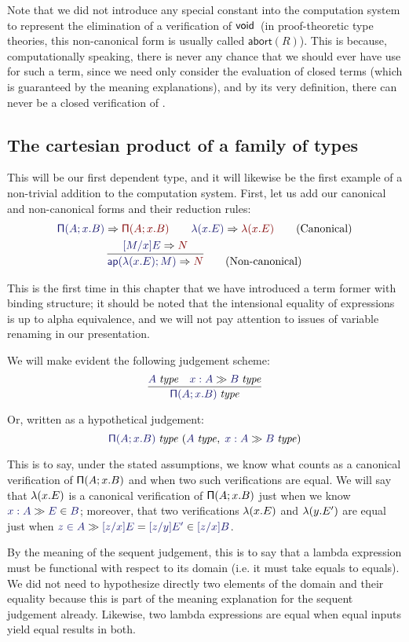 \documentclass[main.tex]{subfiles}
\begin{document}
Note that we did not introduce any special constant into the
computation system to represent the elimination of a verification of
$\mathsf{void}$\ (in proof-theoretic type theories, this non-canonical form
is usually called $\mathsf{abort}(R)$).  This is because,
computationally speaking, there is never any chance that we should
ever have use for such a term, since we need only consider the
evaluation of closed terms (which is guaranteed by the meaning
explanations), and by its very definition, there can never be a closed
verification of \tyvoid.

\subsection{The cartesian product of a family of types}

This will be our first dependent type, and it will likewise be the first
example of a non-trivial addition to the computation system. First, let us add
our canonical and non-canonical forms and their reduction rules:
\begin{gather*}
  \reduce{\typrod{A}{x}{B}}{\typrod{A}{x}{B}}
  \qquad
  \reduce{\lam{x}{E}}{\lam{x}{E}}
  \tag{Canonical}\\
  \infer{
    \reduce{\ap{\lam{x}{E}}{M}}{N}
  }{
    \reduce{[M/x]E}{N}
  }\tag{Non-canonical}
\end{gather*}

This is the first time in this chapter that we have introduced a term former
with binding structure; it should be noted that the intensional equality of
expressions is up to alpha equivalence, and we will not pay attention to issues
of variable renaming in our presentation.

We will make evident the following judgement scheme:
\[
  \infer{
    \isset{\typrod{A}{x}{B}}
  }{
    \isset{A} &
    \sequent{x:A}{\isset{B}}
  }
\]

Or, written as a hypothetical judgement:
\[
  \hyp{\isset{\typrod{A}{x}{B}}}{\isset{A},\;\sequent{x:A}{\isset{B}}}
\]

This is to say, under the stated assumptions, we know what counts as a
canonical verification of $\mathsf{\Pi}(A;x.B)$ and when two such
verifications are equal. We will say that $\mathsf{\lambda}(x.E)$ is a canonical
verification of $\mathsf{\Pi}(A;x.B)$ just when we know
$\sequent{x:A}{\ver{E}{B}}$; moreover, that two verifications
$\mathsf{\lambda}(x.E)$ and $\mathsf{\lambda}(y.E')$ are equal just when
$\sequent{\ver{z}{A}}{\ever{[z/x]E}{[z/y]E'}{[z/x]B}}$.

By the meaning of the sequent judgement, this is to say that a lambda
expression must be functional with respect to its domain (i.e. it must take
equals to equals). We did not need to hypothesize directly two elements of the
domain and their equality because this is part of the meaning explanation for
the sequent judgement already. Likewise, two lambda expressions are equal when
equal inputs yield equal results in both.
\end{document}
